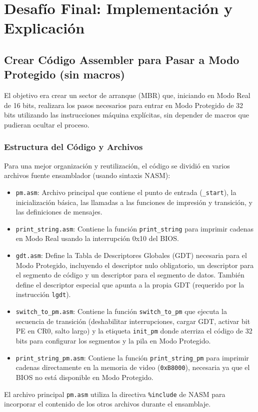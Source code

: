 \section{Desafío Final: Implementación y Explicación}

\subsection{Crear Código Assembler para Pasar a Modo Protegido (sin macros)}

El objetivo era crear un sector de arranque (MBR) que, iniciando en Modo Real de 16 bits, realizara los pasos necesarios para entrar en Modo Protegido de 32 bits utilizando las instrucciones máquina explícitas, sin depender de macros que pudieran ocultar el proceso.

\subsubsection{Estructura del Código y Archivos}

Para una mejor organización y reutilización, el código se dividió en varios archivos fuente ensamblador (usando sintaxis NASM):
\begin{itemize}
    \item \texttt{pm.asm}: Archivo principal que contiene el punto de entrada (\texttt{\_start}), la inicialización básica, las llamadas a las funciones de impresión y transición, y las definiciones de mensajes.
    \item \texttt{print\_string.asm}: Contiene la función \texttt{print\_string} para imprimir cadenas en Modo Real usando la interrupción 0x10 del BIOS.
    \item \texttt{gdt.asm}: Define la Tabla de Descriptores Globales (GDT) necesaria para el Modo Protegido, incluyendo el descriptor nulo obligatorio, un descriptor para el segmento de código y un descriptor para el segmento de datos. También define el descriptor especial que apunta a la propia GDT (requerido por la instrucción \texttt{lgdt}).
    \item \texttt{switch\_to\_pm.asm}: Contiene la función \texttt{switch\_to\_pm} que ejecuta la secuencia de transición (deshabilitar interrupciones, cargar GDT, activar bit PE en CR0, salto largo) y la etiqueta \texttt{init\_pm} donde aterriza el código de 32 bits para configurar los segmentos y la pila en Modo Protegido.
    \item \texttt{print\_string\_pm.asm}: Contiene la función \texttt{print\_string\_pm} para imprimir cadenas directamente en la memoria de video (\texttt{0xB8000}), necesaria ya que el BIOS no está disponible en Modo Protegido.
\end{itemize}
El archivo principal \texttt{pm.asm} utiliza la directiva \texttt{\%include} de NASM para incorporar el contenido de los otros archivos durante el ensamblaje.

